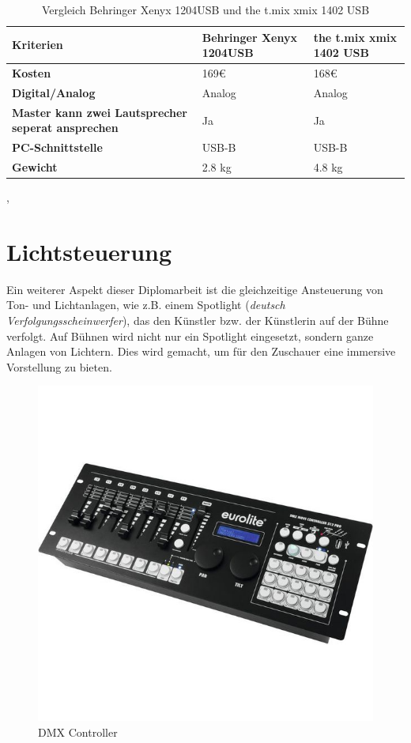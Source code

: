 \begin{table} [H]
	\begin{tabular}{ |p{3.1cm} |p{4.8cm}|p{4.8cm}| }
		\hline
		\textbf{Kriterien} & \textbf{Behringer Xenyx 1204USB}& \textbf{the t.mix xmix 1402 USB}\\
		\hline
		\textbf{Kosten} & 169€ & 168€  \\ 
		\hline
		\textbf{Digital/Analog} & Analog & Analog   \\  
		\hline
		\textbf{Master kann zwei Lautsprecher seperat ansprechen} & Ja & Ja \\
		\hline
		\textbf{PC-Schnittstelle} & USB-B & USB-B  \\
		\hline
		\textbf{Gewicht}& 2.8 kg & 4.8 kg \\
		\hline	
	\end{tabular}
	\caption{Vergleich Behringer Xenyx 1204USB und the t.mix xmix 1402 USB} 
\end{table} 
\textcite{MischpultKriterien1204}, \textcite{MischpultKriterien1402}

\section{Lichtsteuerung}
Ein weiterer Aspekt dieser Diplomarbeit ist die gleichzeitige Ansteuerung von Ton- und Lichtanlagen, wie z.B. einem Spotlight (\emph{deutsch Verfolgungsscheinwerfer}), das den Künstler bzw. der Künstlerin auf der Bühne verfolgt. Auf Bühnen wird nicht nur ein Spotlight eingesetzt, sondern ganze Anlagen von Lichtern. Dies wird gemacht, um für den Zuschauer eine immersive Vorstellung zu bieten. 

\begin{figure}[H]
	\centering
	\includegraphics[width=0.7\linewidth]{images/DMX_Controller.jpg}
	\caption[DMX Controller]{DMX Controller}
	\label{fig:DMX_Controller}
\end{figure}

